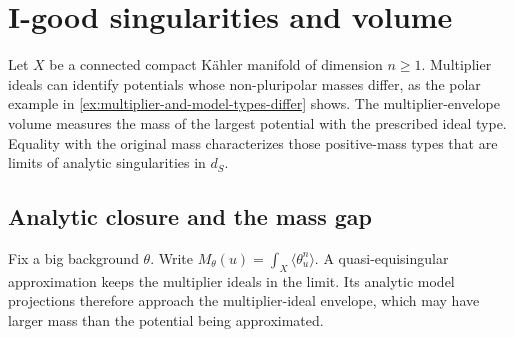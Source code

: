 \chapter{I-good singularities and volume}
\label{chap:q13}

Let $X$ be a connected compact K\"ahler manifold of dimension $n\geq1$. Multiplier ideals can identify potentials whose non-pluripolar masses differ, as the polar example in \cref{ex:multiplier-and-model-types-differ} shows. The multiplier-envelope volume measures the mass of the largest potential with the prescribed ideal type. Equality with the original mass characterizes those positive-mass types that are limits of analytic singularities in $d_S$.

\section{Analytic closure and the mass gap}
\label{sec:i-good-analytic-closure}
Fix a big background $\theta$. Write $M_\theta(u)=\int_X\langle\theta_u^n\rangle$. A quasi-equisingular approximation keeps the multiplier ideals in the limit. Its analytic model projections therefore approach the multiplier-ideal envelope, which may have larger mass than the potential being approximated.

